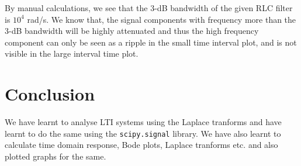 \documentclass[11pt, a4paper]{article}
\begin{document}
By manual calculations, we see that the 3-dB bandwidth of the given RLC filter is $10^4$ rad/s. We know that, the signal components with frequency more than the 3-dB bandwidth will be highly attenuated and thus the high frequency component can only be seen as a ripple in the small time interval plot, and is not visible in the large interval time plot. 

\section{Conclusion}
We have learnt to analyse LTI systems using the Laplace tranforms and have learnt to do the same using the \texttt{scipy.signal} library. We have also learnt to calculate time domain response, Bode plots, Laplace tranforms etc. and also plotted graphs for the same. 
\end{document}
